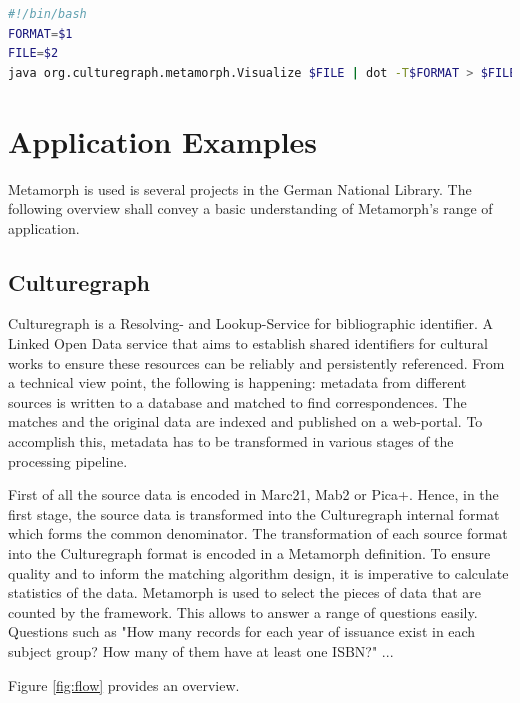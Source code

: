 \documentclass[12pt,a4paper]{article}
\begin{document}
\begin{lstlisting}[float=htb, label=viz_bash,caption=Simple Bash script for visualizing a Metamorph definition., language=Bash]
#!/bin/bash
FORMAT=$1
FILE=$2
java org.culturegraph.metamorph.Visualize $FILE | dot -T$FORMAT > $FILE.$FORMAT
\end{lstlisting}



\section{Application Examples}\label{apps}
 Metamorph is used is several projects in the German National Library. The following overview shall convey a basic understanding of Metamorph's range of application.

\subsection{Culturegraph}\label{culturegraph}
Culturegraph is a Resolving- and Lookup-Service for bibliographic identifier. A Linked Open Data service that aims to establish shared identifiers for cultural works to ensure these resources can be reliably and persistently referenced.
From a technical view point, the following is happening: metadata from different sources is written to a database and matched to find correspondences. The matches and the original data are indexed and published on a web-portal. To accomplish this, metadata has to be transformed in various stages of the processing pipeline.

First of all the source data is encoded in Marc21, Mab2 or Pica+. Hence, in the first stage, the source data is transformed into the Culturegraph internal format which forms the common denominator. The transformation of each source format into the Culturegraph format is encoded in a Metamorph definition. 
To ensure quality and to inform the matching algorithm design, it is imperative to calculate statistics of the data. Metamorph is used to select the pieces of data that are counted by the framework. This allows to answer a range of questions easily. Questions such as "How many records for each year of issuance exist in each subject group? How many of them have at least one ISBN?"
...

 Figure \ref{fig:flow} provides an overview.
\end{document}
